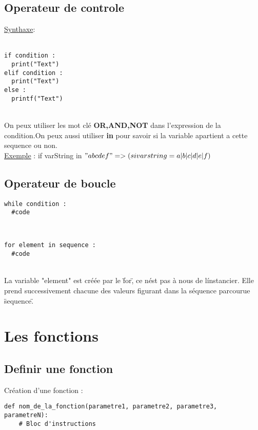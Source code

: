 \documentclass[a4paper,12pt,openany]{book}
\begin{document}
\section{Operateur de controle}
\underline{Synthaxe}:\\
\\
\begin{DDbox}{\linewidth}
\begin{lstlisting}
if condition :
  print("Text")
elif condition :
  print("Text")
else :
  printf("Text")
\end{lstlisting}
\end{DDbox}{\linewidth}
\\
On peux utiliser les mot clé \textbf{OR,AND,NOT} dans l'expression de la condition.On peux aussi utiliser \textbf{in} pour savoir si la variable apartient a cette sequence ou non.\\
\underline{Exemple} :  if varString in $"abcdef" => (si varstring = a|b|c|d|e|f)$ \\


\section{Operateur de boucle}
\begin{DDbox}{\linewidth}
\begin{lstlisting}
while condition :
  #code
\end{lstlisting}
\end{DDbox}{\linewidth}
\\
\begin{DDbox}{\linewidth}
\begin{lstlisting}
for element in sequence :
  #code
\end{lstlisting}
\end{DDbox}{\linewidth}
\\
La variable "element" est créée par le \"for\", ce n\'est pas à nous de l\'instancier. Elle prend successivement chacune des valeurs figurant dans la séquence parcourue \"sequence\".


\chapter{Les fonctions}

\section{Definir une fonction}
Création d'une fonction : \\
\begin{DDbox}{\linewidth}
\begin{lstlisting}
def nom_de_la_fonction(parametre1, parametre2, parametre3, parametreN):
    # Bloc d'instructions
\end{lstlisting}
\end{DDbox}{\linewidth}
\end{document}
